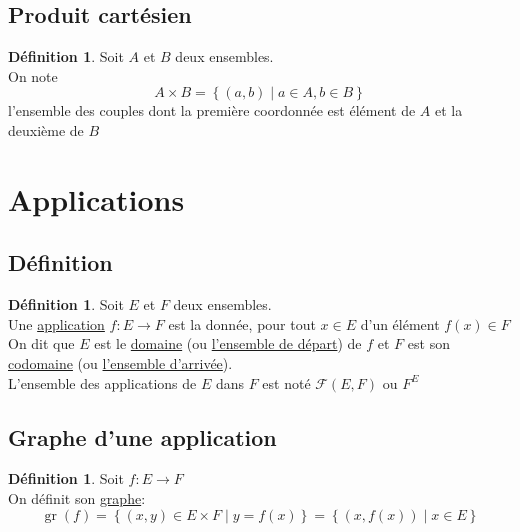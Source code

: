 \documentclass[10pt,a4paper]{article}
\theoremstyle{definition}
\newtheorem{definition}[proposition]{Définition}
\DeclareMathOperator{\gr}{gr}
\begin{document}
\subsection{Produit cartésien}
\begin{definition}
Soit $A$ et $B$ deux ensembles. \\
On note
\[ A \times B = \left\{(a, b) \mid a \in A, b \in B \right\} \]
l'ensemble des couples dont la première coordonnée est élément de $A$ et la deuxième de $B$
\end{definition}

\section{Applications}
\subsection{Définition}
\begin{definition}
Soit $E$ et $F$ deux ensembles. \\
Une \uline{application} $f: E \to F$ est la donnée, pour tout $x \in E$ d'un élément $f(x) \in F$ \\
On dit que $E$ est le \uline{domaine} (ou \uline{l'ensemble de départ}) de $f$ et $F$ est son \uline{codomaine} (ou \uline{l'ensemble d'arrivée}). \\
L'ensemble des applications de $E$ dans $F$ est noté $\mathcal{F}(E, F)$ ou $F^E$
\end{definition}

\subsection{Graphe d'une application}
\begin{definition}
Soit $f: E \to F$ \\
On définit son \uline{graphe}:
\[ \gr(f) = \left\{ (x, y) \in E \times F \mid y = f(x) \right\} = \left\{ (x, f(x)) \mid x \in E \right\} \]
\end{definition}
\end{document}
